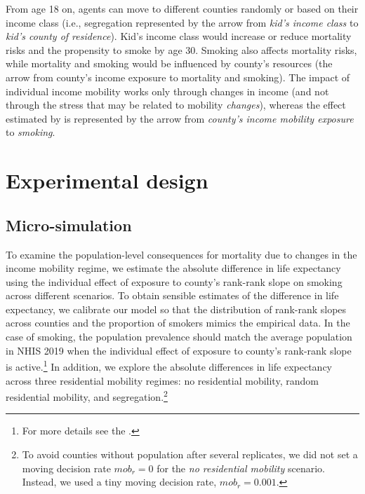 \documentclass[class=article, crop=false, 12pt]{standalone}
\begin{document}
From age 18 on, agents can move to different counties randomly or based on their income class (i.e., segregation represented by the arrow from \emph{kid's income class} to \emph{kid's county of residence}).
Kid's income class would increase or reduce mortality risks and the propensity to smoke by age 30. Smoking also affects mortality risks, while mortality and smoking would be influenced by county's resources (the arrow from county's income exposure to mortality and smoking). The impact of individual income mobility works only through changes in income (and not through the stress that may be related to mobility \emph{changes}), whereas the effect estimated by \citet{daza2021} is represented by the arrow from \emph{county's income mobility exposure} to \textit{smoking}.



\section{Experimental design}\label{sec:expDesign}

\subsection{Micro-simulation}

To examine the population-level consequences for mortality due to changes in the income mobility regime, we estimate the absolute difference in life expectancy using the individual effect of exposure to county's rank-rank slope on smoking across different scenarios. To obtain sensible estimates of the difference in life expectancy, we calibrate our model so that the distribution of rank-rank slopes across counties and the proportion of smokers mimics the empirical data. In the case of smoking, the population prevalence should match the average population in NHIS 2019 when the individual effect of exposure to county's rank-rank slope is active.\footnote{For more details see the \textit{}.} In addition, we explore the absolute differences in life expectancy across three residential mobility regimes: no residential mobility, random residential mobility, and segregation.\footnote{To avoid counties without population after several replicates, we did not set a moving decision rate $mob_r=0$ for the \textit{no residential mobility} scenario. Instead, we used a tiny moving decision rate, $mob_r = 0.001$.} 
\end{document}

